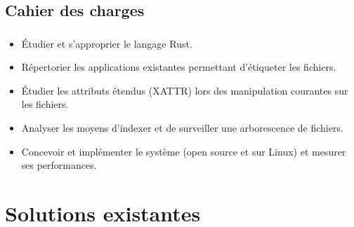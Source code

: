\documentclass[10pt]{beamer}
\begin{document}
\subsection{Cahier des charges}
\begin{frame}
    \frametitle{\subsecname}
    \begin{itemize}
        \item Étudier et s'approprier le langage Rust.
        \pause
        \item Répertorier les applications existantes permettant d'étiqueter les fichiers.
        \pause
        \item Étudier les attributs étendus (XATTR) lors des manipulation courantes sur les fichiers.
        \pause
        \item Analyser les moyens d'indexer et de surveiller une arborescence de fichiers.
        \pause
        \item Concevoir et implémenter le système (open source et sur Linux) et mesurer ses performances.
    \end{itemize}
\end{frame}

\section{Solutions existantes}
\end{document}

